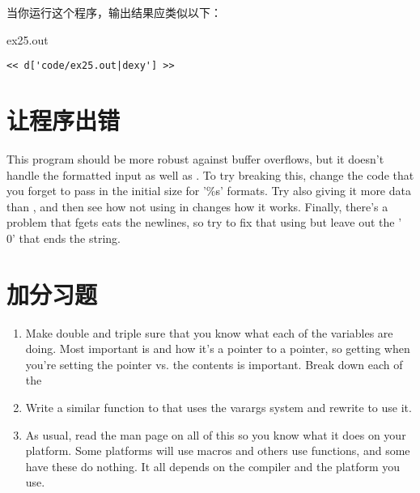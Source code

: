 当你运行这个程序，输出结果应类似以下：

\begin{code}{ex25.out}
\begin{lstlisting}
<< d['code/ex25.out|dexy'] >>
\end{lstlisting}
\end{code}

\section{让程序出错}

This program should be more robust against buffer overflows, but it doesn't
handle the formatted input as well as .  To try breaking this,
change the code that you forget to pass in the initial size for '\%s' formats.
Try also giving it more data than , and then see how not
using  in  changes how it works.  Finally,
there's a problem that fgets eats the newlines, so try to fix that using
 but leave out the '\\0' that ends the string.

\section{ 加分习题}

\begin{enumerate}
\item Make double and triple sure that you know what each of the 
    variables are doing.  Most important is  and how it's
    a pointer to a pointer, so getting when you're setting the pointer vs. the
    contents is important.  Break down each of the 
\item Write a similar function to  that uses the varargs system
    and rewrite  to use it.
\item As usual, read the man page on all of this so you know what it does
    on your platform.  Some platforms will use macros and others use
    functions, and some have these do nothing.  It all depends on the 
    compiler and the platform you use.
\end{enumerate}

